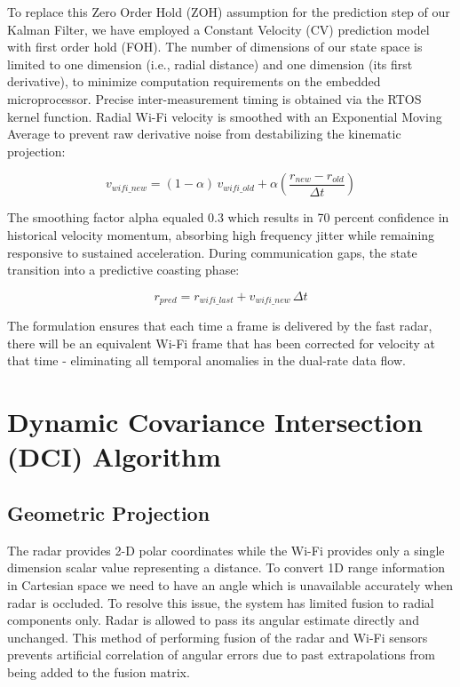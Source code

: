 To replace this Zero Order Hold (ZOH) assumption for the prediction step of our Kalman Filter, we have employed a Constant Velocity (CV) prediction model with first order hold (FOH). The number of dimensions of our state space is limited to one dimension (i.e., radial distance) and one dimension (its first derivative), to minimize computation requirements on the embedded microprocessor. Precise inter-measurement timing is obtained via the RTOS kernel function. Radial Wi-Fi velocity is smoothed with an Exponential Moving Average to prevent raw derivative noise from destabilizing the kinematic projection:

\begin{equation}
v_{wifi\_new} = (1 - \alpha)\, v_{wifi\_old} + \alpha \left( \frac{r_{new} - r_{old}}{\Delta t} \right)
\label{eq:ema}
\end{equation}

The smoothing factor alpha equaled 0.3 which results in 70 percent confidence in historical velocity momentum, absorbing high frequency jitter while remaining responsive to sustained acceleration. During communication gaps, the state transition into a predictive coasting phase:

\begin{equation}
r_{pred} = r_{wifi\_last} + v_{wifi\_new}\, \Delta t
\label{eq:coast}
\end{equation}

The formulation ensures that each time a frame is delivered by the fast radar, there will be an equivalent Wi-Fi frame that has been corrected for velocity at that time - eliminating all temporal anomalies in the dual-rate data flow.

\section{Dynamic Covariance Intersection (DCI) Algorithm}
\label{sec:dci}

\subsection{Geometric Projection}
\label{sec:geom_proj}

The radar provides 2-D polar coordinates while the Wi-Fi provides only a single dimension scalar value representing a distance. To convert 1D range information in Cartesian space we need to have an angle which is unavailable accurately when radar is occluded. To resolve this issue, the system has limited fusion to radial components only. Radar is allowed to pass its angular estimate directly and unchanged. This method of performing fusion of the radar and Wi-Fi sensors prevents artificial correlation of angular errors due to past extrapolations from being added to the fusion matrix.

